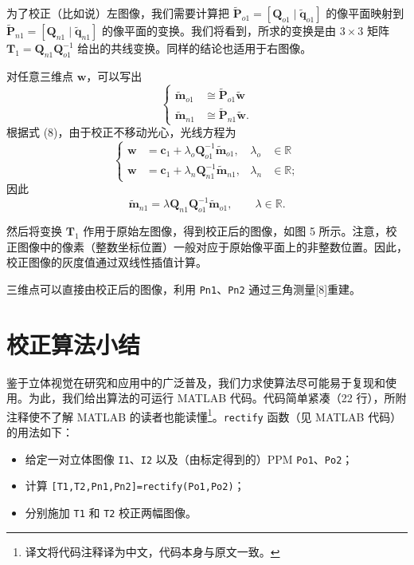 \documentclass[a4paper,twocolumn,zihao=5,fontset=none,UTF8]{ctexart}
\newcommand{\bP}{\widetilde{\mathbf{P}}}
\newcommand{\Q}{\mathbf{Q}}
\newcommand{\tq}{\widetilde{\mathbf{q}}}
\newcommand{\w}{\mathbf{w}}
\newcommand{\cc}{\mathbf{c}}
\newcommand{\tm}{\widetilde{\mathbf{m}}}
\newcommand{\tw}{\widetilde{\mathbf{w}}}
\begin{document}
为了校正（比如说）左图像，我们需要计算把 $\bP_{o1}=[\Q_{o1}\mid\tq_{o1}]$ 的像平面映射到 $\bP_{n1}=[\Q_{n1}\mid\tq_{n1}]$ 的像平面的变换。我们将看到，所求的变换是由 $3\times3$ 矩阵 $\mathbf{T}_1=\Q_{n1}\Q_{o1}^{-1}$ 给出的共线变换。同样的结论也适用于右图像。

对任意三维点 $\w$，可以写出
\begin{equation}
  \left\{\begin{aligned}
    \tm_{o1}&\cong\bP_{o1}\tw\\
    \tm_{n1}&\cong\bP_{n1}\tw.
  \end{aligned}\right.
\end{equation}
根据式 (8)，由于校正不移动光心，光线方程为
\begin{equation}
  \left\{\begin{aligned}
    \w&=\cc_1+\lambda_o\Q_{o1}^{-1}\tm_{o1}, & \lambda_o&\in\mathbb{R}\\
    \w&=\cc_1+\lambda_n\Q_{n1}^{-1}\tm_{n1}, & \lambda_n&\in\mathbb{R};
  \end{aligned}\right.
\end{equation}
因此
\begin{equation}
  \tm_{n1}=\lambda\Q_{n1}\Q_{o1}^{-1}\tm_{o1},\qquad \lambda\in\mathbb{R}.
\end{equation}

然后将变换 $\mathbf{T}_1$ 作用于原始左图像，得到校正后的图像，如图 5 所示。注意，校正图像中的像素（整数坐标位置）一般对应于原始像平面上的非整数位置。因此，校正图像的灰度值通过双线性插值计算。

三维点可以直接由校正后的图像，利用 \texttt{Pn1}、\texttt{Pn2} 通过三角测量[8]重建。

\section{校正算法小结}

鉴于立体视觉在研究和应用中的广泛普及，我们力求使算法尽可能易于复现和使用。为此，我们给出算法的可运行 MATLAB 代码。代码简单紧凑（22 行），所附注释使不了解 MATLAB 的读者也能读懂\footnote{译文将代码注释译为中文，代码本身与原文一致。}。\texttt{rectify} 函数（见 MATLAB 代码）的用法如下：
\begin{itemize}[label=--]
  \item 给定一对立体图像 \texttt{I1}、\texttt{I2} 以及（由标定得到的）PPM \texttt{Po1}、\texttt{Po2}；
  \item 计算 \texttt{[T1,T2,Pn1,Pn2]=rectify(Po1,Po2)}；
  \item 分别施加 \texttt{T1} 和 \texttt{T2} 校正两幅图像。
\end{itemize}
\end{document}
